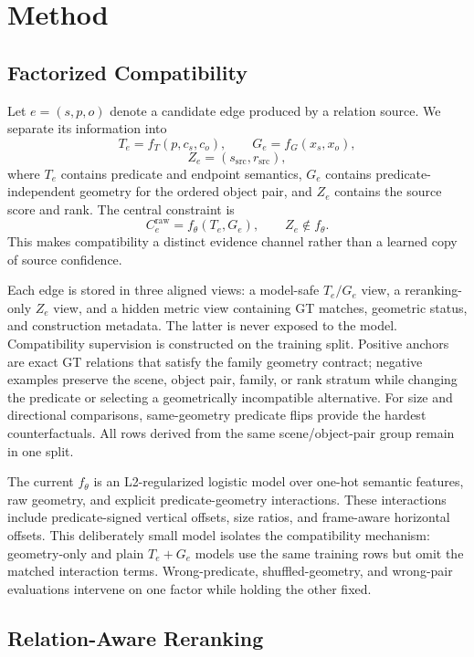 \documentclass[letterpaper]{article} %
\newcommand{\Te}{\ensuremath{T_e}}
\newcommand{\Ge}{\ensuremath{G_e}}
\newcommand{\Ze}{\ensuremath{Z_e}}
\begin{document}
\section{Method}

\subsection{Factorized Compatibility}

Let $e=(s,p,o)$ denote a candidate edge produced by a relation source. We
separate its information into
\[
\Te=f_T(p,c_s,c_o),\qquad
\Ge=f_G(x_s,x_o),
\]
\[
\Ze=(s_{\mathrm{src}},r_{\mathrm{src}}),
\]
where $\Te$ contains predicate and endpoint semantics, $\Ge$ contains
predicate-independent geometry for the ordered object pair, and $\Ze$ contains
the source score and rank. The central constraint is
\[
C_e^{\mathrm{raw}}=f_\theta(\Te,\Ge),\qquad
\Ze\notin f_\theta .
\]
This makes compatibility a distinct evidence channel rather than a learned copy
of source confidence.

Each edge is stored in three aligned views: a model-safe $\Te/\Ge$ view, a
reranking-only $\Ze$ view, and a hidden metric view containing GT matches,
geometric status, and construction metadata. The latter is never exposed to the
model. Compatibility supervision is constructed on the training split. Positive
anchors are exact GT relations that satisfy the family geometry contract;
negative examples preserve the scene, object pair, family, or rank stratum while
changing the predicate or selecting a geometrically incompatible alternative.
For size and directional comparisons, same-geometry predicate flips provide the
hardest counterfactuals. All rows derived from the same scene/object-pair group
remain in one split.

The current $f_\theta$ is an L2-regularized logistic model over one-hot semantic
features, raw geometry, and explicit predicate-geometry interactions. These
interactions include predicate-signed vertical offsets, size ratios, and
frame-aware horizontal offsets. This deliberately small model isolates the
compatibility mechanism: geometry-only and plain $\Te+\Ge$ models use the same
training rows but omit the matched interaction terms. Wrong-predicate,
shuffled-geometry, and wrong-pair evaluations intervene on one factor while
holding the other fixed.

\subsection{Relation-Aware Reranking}
\end{document}
